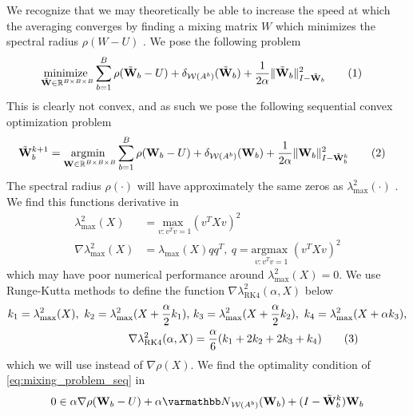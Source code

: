 \documentclass{article}
\newcommand\numberthis{\addtocounter{equation}{1}\tag{\theequation}}
\begin{document}
 We recognize that we may theoretically be able to increase the speed at which the averaging converges by finding a mixing matrix $W$ which minimizes the spectral radius $\rho(W-U)$ \cite{olshevsky2009convergence}. We pose the following problem
\begin{align*}
    \underset{\tilde{\vW} \in \RR^{B \times B \times B}}{\text{minimize }} & \sum^B_{b=1} \rho(\tilde{\vW}_b - U) + \delta_{\cW(A^b)}(\tilde{\vW}_b) + \frac{1}{2\alpha}\|\tilde{\vW}_b\|^2_{I-\tilde{\vW}_b}
    \numberthis \label{eq:mixing_problem_distt}
\end{align*}
This is clearly not convex, and as such we pose the following sequential convex optimization problem
\begin{align*}
    \tilde{\vW}_b^{k+1} = \underset{\vW \in \RR^{B \times B \times B}}{\text{argmin }} & \sum^B_{b=1} \rho(\vW_b - U) + 
    \delta_{\cW(A^b)}(\vW_b)+ \frac{1}{2\alpha}\|\vW_b\|^2_{I-\tilde{\vW}^k_b}
    \numberthis \label{eq:mixing_problem_seq}
\end{align*}
The spectral radius $\rho(\cdot)$ will have approximately the same zeros as $\lambda^2_\text{max}(\cdot)$ \cite{xiao2004fast}. We find this functions derivative in
\begin{align*}
    \lambda^2_\text{max}(X) &= \underset{v:v^Tv=1}{\text{max }} (v^TXv)^2 \\
    \nabla \lambda^2_\text{max}(X)
    &=
    \lambda_\text{max}(X) qq^T,\ q = \underset{v:v^Tv=1}{\text{argmax }} (v^TXv)^2 
\end{align*}
which may have poor numerical performance around $\lambda^2_\text{max}(X) = 0$. We use Runge-Kutta methods \cite{butcher2007runge} to define the function $\nabla \lambda^2_\text{RK4}(\alpha, X)$ below
\begin{align*}
    k_1 = \lambda^2_\text{max}(X),\ 
    k_2 = \lambda^2_\text{max}(X + \frac{\alpha}{2} k_1),\ &
    k_3 = \lambda^2_\text{max}(X + \frac{\alpha}{2} k_2),\ 
    k_4 = \lambda^2_\text{max}(X + \alpha k_3),\\
    \nabla \lambda^2_\text{RK4}(\alpha, X) &= \frac{\alpha}{6}(k_1 + 2k_2 + 2k_3 + k_4) \numberthis \label{eq:eigstep}
\end{align*}
which we will use instead of $\nabla \rho(X)$. We find the optimality condition of \eqref{eq:mixing_problem_seq} in
\begin{align*}
    0 \in \alpha \nabla \rho(\vW_b - U) + 
    \alpha \opN_{\cW(A^b)}(\vW_b)+ (I - \tilde{\vW}^k_b)\vW_b
\end{align*}
\end{document}
